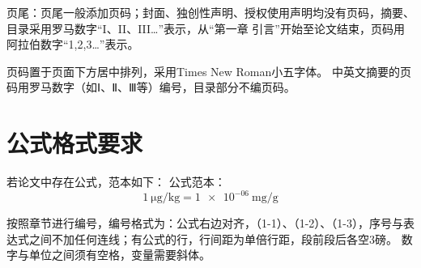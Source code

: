 页尾：页尾一般添加页码；封面、独创性声明、授权使用声明均没有页码，摘要、目录采用罗马数字“I、II、III…”表示，从“第一章 引言”开始至论文结束，页码用阿拉伯数字“1,2,3…”表示。

页码置于页面下方居中排列，采用Times New Roman小五字体。
中英文摘要的页码用罗马数字（如Ⅰ、Ⅱ、Ⅲ等）编号，目录部分不编页码。

\section{公式格式要求}

若论文中存在公式，范本如下：
公式范本：
\begin{equation}
    1~\unit{\ug\per\kg} = \num{1e-06}~\unit{\mg\per\g}
\end{equation}

按照章节进行编号，编号格式为：公式右边对齐，（1-1）、（1-2）、（1-3），序号与表达式之间不加任何连线；有公式的行，行间距为单倍行距，段前段后各空3磅。
数字与单位之间须有空格，变量需要斜体。
